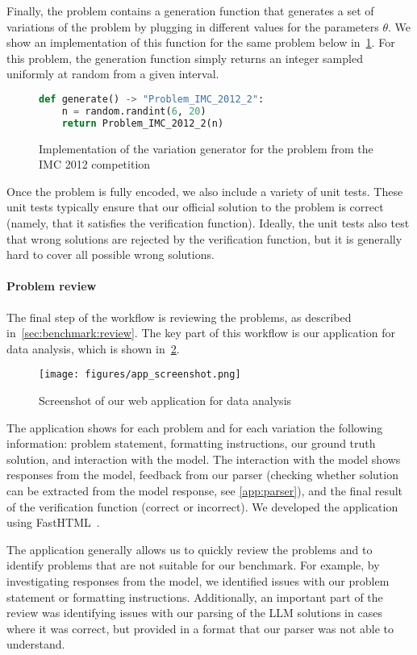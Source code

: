 Finally, the problem contains a generation function that generates a set of variations of the problem by plugging in different values for the parameters $\theta$. We show an implementation of this function for the same problem below in~\cref{fig:problem:generation}. For this problem, the generation function simply returns an integer sampled uniformly at random from a given interval.

\begin{figure}[h]
\begin{lstlisting}[language=Python]
def generate() -> "Problem_IMC_2012_2":
    n = random.randint(6, 20)
    return Problem_IMC_2012_2(n)
\end{lstlisting}
\vspace{-3mm}

\caption{Implementation of the variation generator for the problem from the IMC 2012 competition}
\vspace{-3mm}
\label{fig:problem:generation}
\end{figure}

Once the problem is fully encoded, we also include a variety of unit tests.
These unit tests typically ensure that our official solution to the problem is correct (namely, that it satisfies the verification function).
Ideally, the unit tests also test that wrong solutions are rejected by the verification function, but it is generally hard to cover all possible wrong solutions.

\paragraph{Problem review}

The final step of the workflow is reviewing the problems, as described in~\cref{sec:benchmark:review}.
The key part of this workflow is our application for data analysis, which is shown in~\cref{fig:data:analysis}.

\begin{figure}[h]
    \centering
    \texttt{[image: figures/app\_screenshot.png]}
    \caption{Screenshot of our web application for data analysis}
    \label{fig:data:analysis}
\end{figure}

The application shows for each problem and for each variation the following information: problem statement, formatting instructions, our ground truth solution, and interaction with the model. The interaction with the model shows responses from the model, feedback from our parser (checking whether solution can be extracted from the model response, see \cref{app:parser}), and the final result of the verification function (correct or incorrect).
We developed the application using FastHTML~\cite{fasthtml}.

The application generally allows us to quickly review the problems and to identify problems that are not suitable for our benchmark.
For example, by investigating responses from the model, we identified issues with our problem statement or formatting instructions.
Additionally, an important part of the review was identifying issues with our parsing of the LLM solutions in cases where it was correct, but provided in a format that our parser was not able to understand.
